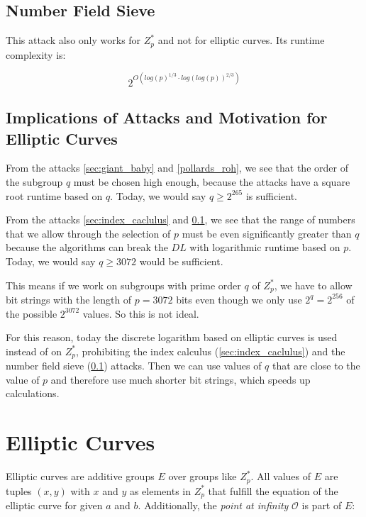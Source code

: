 \subsection{Number Field Sieve}\label{sec:number_field_sieve}

This attack also only works for $Z_p^*$ and not for elliptic curves.
Its runtime complexity is:

$$
    2^{O(log(p)^{1/3} \cdot log(log(p))^{2/3})}
$$


\subsection{Implications of Attacks and Motivation for Elliptic Curves}

From the attacks \ref{sec:giant_baby} and \ref{pollards_roh}, we see that the order of the subgroup $q$ must be chosen high enough, because the attacks have a square root runtime based on $q$. Today, we would say $q \geq 2^265$ is sufficient.

From the attacks \ref{sec:index_caclulus} and \ref{sec:number_field_sieve}, we see that the range of numbers that we allow through the selection of $p$ must be even significantly greater than $q$ because the algorithms can break the $DL$ with logarithmic runtime based on $p$. Today, we would say $q \geq 3072$ would be sufficient.

This means if we work on subgroups with prime order $q$ of $Z_p^*$, we have to allow bit strings with the length of $p = 3072$ bits even though we only use $2^q = 2^256$ of the possible $2^3072$ values.
So this is not ideal.

For this reason, today the discrete logarithm based on elliptic curves is used instead of on $Z_p^*$, prohibiting the index calculus (\ref{sec:index_caclulus}) and the number field sieve (\ref{sec:number_field_sieve}) attacks.
Then we can use values of $q$ that are close to the value of $p$ and therefore use much shorter bit strings, which speeds up calculations.


\section{Elliptic Curves}\label{sec:ell_curves}

Elliptic curves are additive groups $E$ over groups like $Z_p^*$.
All values of $E$ are tuples $(x,y)$ with $x$ and $y$ as elements in $Z_p^*$ that fulfill the equation of the elliptic curve for given $a$ and $b$. Additionally, the \textit{point at infinity} $\mathcal{O}$ is part of $E$:

